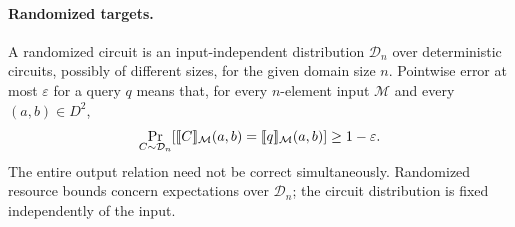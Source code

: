 \paragraph{Randomized targets.}
A randomized circuit is an input-independent distribution
$\mathcal D_n$ over deterministic circuits, possibly of different
sizes, for the given domain size $n$. Pointwise error at most
$\varepsilon$ for a query $q$ means that, for every $n$-element input
$\mathcal M$ and every $(a,b)\in D^2$,
\[
 \Pr_{C\sim\mathcal D_n}\!\left[
   \llbracket C\rrbracket_{\mathcal M}(a,b)=\llbracket q\rrbracket_{\mathcal M}(a,b)
 \right]\ge1-\varepsilon.
\]
The entire output relation need not be correct simultaneously.
Randomized resource bounds concern expectations over $\mathcal D_n$;
the circuit distribution is fixed independently of the input.
